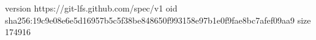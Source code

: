 version https://git-lfs.github.com/spec/v1
oid sha256:19c9e08e6e5d16957b5c5f38be848650f993158e97b1e0f9fae8bc7afef09aa9
size 174916
